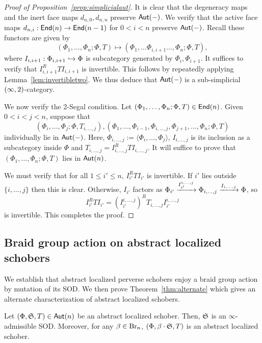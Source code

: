 \begin{proof}[Proof of Proposition~\ref{prop:simplicialaut}]
    It is clear that the degeneracy maps and the inert face maps $d_{n,0},d_{n,n}$ preserve $\mathsf{Aut}(-)$. We verify that the active face maps $d_{n,i}:\mathsf{End}(n)\to\mathsf{End}(n-1)$ for $0<i<n$ preserve $\mathsf{Aut}(-)$. Recall these functors are given by
    \[(\Phi_1,\dots,\Phi_n;\Phi,T)\mapsto (\Phi_1,\dots\Phi_{i,i+1}\dots,\Phi_n;\Phi,T),\]
    where $I_{i,i+1}:\Phi_{i,i+1} \hookrightarrow \Phi$ is subcategory generated by $\Phi_i,\Phi_{i+1}$. It suffices to verify that $I_{i,i+1}^RTI_{i,i+1}$ is invertible. This follows by repeatedly applying Lemma~\ref{lem:invertibletwo}. We thus deduce that $\mathsf{Aut}(-)$ is a sub-simplicial $(\infty,2)$-category.

    We now verify the 2-Segal condition. Let $(\Phi_1,\dots,\Phi_n;\Phi,T)\in \mathsf{End}(n)$. Given $0<i<j<n$, suppose that
    \[(\Phi_i,\dots,\Phi_j;\Phi,T_{i,\dots,j}), (\Phi_1,\dots,\Phi_{i-1},\Phi_{i,\dots,j},\Phi_{j+1},\dots,\Phi_n;\Phi,T)\]
    individually lie in $\mathsf{Aut}(-)$. Here, $\Phi_{i,\dots,j} := \langle\Phi_i,\dots,\Phi_j\rangle$, $I_{i,\dots,j}$ is its inclusion as a subcategory inside $\Phi$ and $T_{i,\dots,j} = I_{i,\dots,j}^RTI_{i,\dots,j}$. It will suffice to prove that $(\Phi_1,\dots,\Phi_n;\Phi,T)$ lies in $\mathsf{Aut}(n)$.

    We must verify that for all $1\leq i' \leq n$, $I_{i'}^RTI_{i'}$ is invertible. If $i'$ lies outside $\{i,\dots,j\}$ then this is clear. Otherwise, $I_{i'}$ factors as $\Phi_{i'}\xrightarrow{I_{i'}^{i,\dots,j}} \Phi_{i,\dots,j}\xrightarrow{I_{i,\dots,j}} \Phi$, so
    \[I_{i'}^RTI_{i'} = (I_{i'}^{i,\dots,j})^RT_{i,\dots,j}I_{i'}^{i,\dots,j}\]
    is invertible. This completes the proof.
\end{proof}

\subsection{Braid group action on abstract localized schobers}\label{subsection:admissible}
We establish that abstract localized perverse schobers enjoy a braid group action by mutation of its SOD. We then prove Theorem~\ref{thm:alternate} which gives an alternate characterization of abstract localized schobers.

\begin{thm}\label{thm:inftyadmissible}
    Let $(\Phi,\mathfrak{S},T)\in\mathsf{Aut}(n)$ be an abstract localized schober. Then, $\mathfrak{S}$ is an $\infty$-admissible SOD. Moreover, for any $\beta\in\operatorname{Br}_n$, $(\Phi,\beta\cdot\mathfrak{S},T)$ is an abstract localized schober.
\end{thm}

